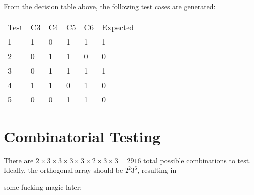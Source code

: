 \documentclass[letterpaper]{article}
\begin{document}
From the decision table above, the following test cases are generated:
\vspace{20pt}

\begin{adjustbox}{max width=\textwidth, center}
	\begin{tabular}{llllll}
		Test & C3 & C4 & C5 & C6 & Expected \\ \cline{1-1} \cline{6-6}
		1    & 1  & 0  & 1  & 1  & 1        \\
		2    & 0  & 1  & 1  & 0  & 0        \\
		3    & 0  & 1  & 1  & 1  & 1        \\
		4    & 1  & 1  & 0  & 1  & 0        \\
		5    & 0  & 0  & 1  & 1  & 0        \\
	\end{tabular}
\end{adjustbox}
\section{Combinatorial Testing}
There are
$2 \times 3 \times 3 \times 3 \times 3 \times 2 \times 3 \times 3 = 2916$
total possible combinations to test.
Ideally, the orthogonal array should be $2^2 3^6$,
resulting in

some fucking magic later: 
\end{document}
